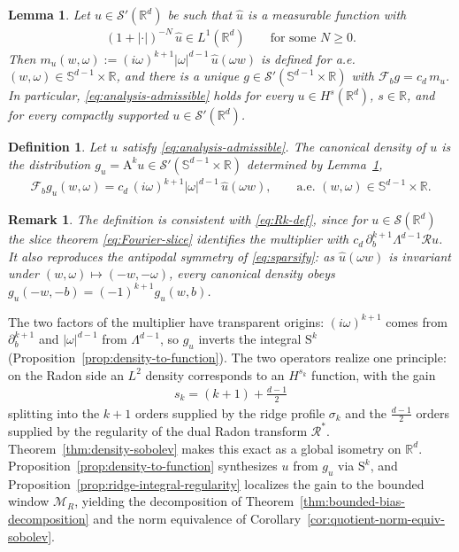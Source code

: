 \documentclass[12pt]{article}
\numberwithin{equation}{section}
\newtheorem{remark}{Remark}
\newtheorem{definition}{Definition}[section]
\newtheorem{lemma}{Lemma}[section]
\numberwithin{figure}{section}
\numberwithin{equation}{section}
\begin{document}
\begin{lemma}
\label{lem:analysis-multiplier-wellposed}
Let $u\in\mathcal S'(\mathbb R^d)$ be such that $\widehat u$ is a measurable function with
\begin{align}
    (1+|\cdot|)^{-N}\,\widehat u\in L^1(\mathbb R^d)
    \qquad\text{for some }N\ge0 .
    \label{eq:analysis-admissible}
\end{align}
Then $m_u(w,\omega):=(i\omega)^{k+1}|\omega|^{d-1}\,\widehat u(\omega w)$ is defined for
a.e.\ $(w,\omega)\in\mathbb S^{d-1}\times\mathbb R$, and there is a unique 
$g\in\mathcal S'(\mathbb S^{d-1}\times\mathbb R)$
with $\mathcal F_b g=c_d\,m_u$. In particular, \eqref{eq:analysis-admissible} holds for every
$u\in H^{s}(\mathbb R^d)$, $s\in\mathbb R$, and for every compactly supported
$u\in\mathcal S'(\mathbb R^d)$.
\end{lemma}

\begin{definition}
\label{def:canonical-density}
Let $u$ satisfy \eqref{eq:analysis-admissible}. The \emph{canonical density} of $u$ is the
distribution $g_u=\mathrm{A}^k u\in\mathcal S'(\mathbb S^{d-1}\times\mathbb R)$ determined
by Lemma~\ref{lem:analysis-multiplier-wellposed},
\begin{align*}
    \mathcal F_b g_u(w,\omega)
    =c_d\,(i\omega)^{k+1}|\omega|^{d-1}\,\widehat u(\omega w),
    \qquad\text{a.e.\ }(w,\omega)\in\mathbb S^{d-1}\times\mathbb R .
\end{align*}
\end{definition}

\begin{remark}
The definition is consistent with \eqref{eq:Rk-def}, since for $u\in\mathcal S(\mathbb R^d)$
the slice theorem \eqref{eq:Fourier-slice} identifies the multiplier with
$c_d\,\partial_b^{k+1}\Lambda^{d-1}\mathcal Ru$. It also reproduces the antipodal symmetry
of \eqref{eq:sparsify}: as $\widehat u(\omega w)$ is invariant under
$(w,\omega)\mapsto(-w,-\omega)$, every canonical density obeys
$g_u(-w,-b)=(-1)^{k+1}g_u(w,b)$.
\end{remark}

The two factors of the multiplier have transparent origins: $(i\omega)^{k+1}$ comes from
$\partial_b^{k+1}$ and $|\omega|^{d-1}$ from $\Lambda^{d-1}$, so $g_u$ inverts the integral
$\mathrm{S}^k$ (Proposition~\ref{prop:density-to-function}). The two operators realize one
principle: on the Radon side an $L^2$ density corresponds to an $H^{s_k}$ function, with the
gain
\begin{align*}
    s_k=(k+1)+\tfrac{d-1}{2}
\end{align*}
splitting into the $k+1$ orders supplied by the ridge profile $\sigma_k$ and the
$\tfrac{d-1}{2}$ orders supplied by the regularity of the dual Radon transform
$\mathcal R^*$. Theorem~\ref{thm:density-sobolev} makes this exact as a global isometry on
$\mathbb R^d$. Proposition~\ref{prop:density-to-function} synthesizes $u$ from $g_u$ via
$\mathrm{S}^k$, and Proposition~\ref{prop:ridge-integral-regularity} localizes the gain to
the bounded window $\mathcal M_R$, yielding the decomposition of
Theorem~\ref{thm:bounded-bias-decomposition} and the norm equivalence of
Corollary~\ref{cor:quotient-norm-equiv-sobolev}.
\end{document}
